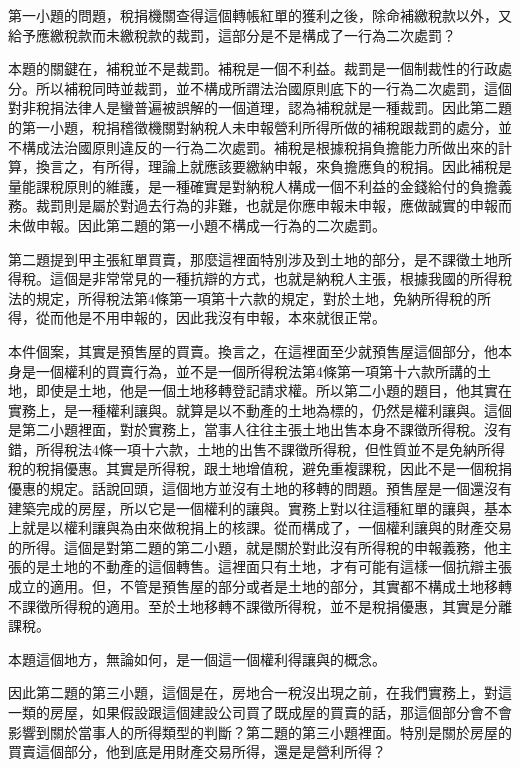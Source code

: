 \documentclass[]{ctexbook}
\begin{document}
第一小題的問題，稅捐機關查得這個轉帳紅單的獲利之後，除命補繳稅款以外，又給予應繳稅款而未繳稅款的裁罰，這部分是不是構成了一行為二次處罰？

本題的關鍵在，補稅並不是裁罰。補稅是一個不利益。裁罰是一個制裁性的行政處分。所以補稅同時並裁罰，並不構成所謂法治國原則底下的一行為二次處罰，這個對非稅捐法律人是蠻普遍被誤解的一個道理，認為補稅就是一種裁罰。因此第二題的第一小題，稅捐稽徵機關對納稅人未申報營利所得所做的補稅跟裁罰的處分，並不構成法治國原則違反的一行為二次處罰。補稅是根據稅捐負擔能力所做出來的計算，換言之，有所得，理論上就應該要繳納申報，來負擔應負的稅捐。因此補稅是量能課稅原則的維護，是一種確實是對納稅人構成一個不利益的金錢給付的負擔義務。裁罰則是屬於對過去行為的非難，也就是你應申報未申報，應做誠實的申報而未做申報。因此第二題的第一小題不構成一行為的二次處罰。

第二題提到甲主張紅單買賣，那麼這裡面特別涉及到土地的部分，是不課徵土地所得稅。這個是非常常見的一種抗辯的方式，也就是納稅人主張，根據我國的所得稅法的規定，所得稅法第4條第一項第十六款的規定，對於土地，免納所得稅的所得，從而他是不用申報的，因此我沒有申報，本來就很正常。

本件個案，其實是預售屋的買賣。換言之，在這裡面至少就預售屋這個部分，他本身是一個權利的買賣行為，並不是一個所得稅法第4條第一項第十六款所講的土地，即使是土地，他是一個土地移轉登記請求權。所以第二小題的題目，他其實在實務上，是一種權利讓與。就算是以不動產的土地為標的，仍然是權利讓與。這個是第二小題裡面，對於實務上，當事人往往主張土地出售本身不課徵所得稅。沒有錯，所得稅法4條一項十六款，土地的出售不課徵所得稅，但性質並不是免納所得稅的稅捐優惠。其實是所得稅，跟土地增值稅，避免重複課稅，因此不是一個稅捐優惠的規定。話說回頭，這個地方並沒有土地的移轉的問題。預售屋是一個還沒有建築完成的房屋，所以它是一個權利的讓與。實務上對以往這種紅單的讓與，基本上就是以權利讓與為由來做稅捐上的核課。從而構成了，一個權利讓與的財產交易的所得。這個是對第二題的第二小題，就是關於對此沒有所得稅的申報義務，他主張的是土地的不動產的這個轉售。這裡面只有土地，才有可能有這樣一個抗辯主張成立的適用。但，不管是預售屋的部分或者是土地的部分，其實都不構成土地移轉不課徵所得稅的適用。至於土地移轉不課徵所得稅，並不是稅捐優惠，其實是分離課稅。

本題這個地方，無論如何，是一個這一個權利得讓與的概念。

因此第二題的第三小題，這個是在，房地合一稅沒出現之前，在我們實務上，對這一類的房屋，如果假設跟這個建設公司買了既成屋的買賣的話，那這個部分會不會影響到關於當事人的所得類型的判斷？第二題的第三小題裡面。特別是關於房屋的買賣這個部分，他到底是用財產交易所得，還是是營利所得？
\end{document}
